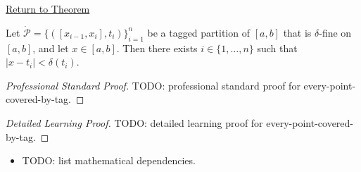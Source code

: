 \newpage
{}
\label{prf:every-point-covered-by-tag}

\begin{remark*}[Return]
\hyperref[lem:every-point-covered-by-tag]{Return to Theorem}
\end{remark*}

\begin{lemma*}
Let $\dot{\mathcal{P}}=\{([x_{i-1},x_i],t_i)\}_{i=1}^n$ be a tagged partition of $[a,b]$ that is $\delta$-fine on $[a,b]$, and let $x\in[a,b]$. Then there exists $i\in\{1,\ldots,n\}$ such that $|x-t_i|<\delta(t_i)$.
\end{lemma*}

\begin{proof}[Professional Standard Proof]
\LRAProofBodyStart
TODO: professional standard proof for every-point-covered-by-tag.
\end{proof}

\begin{proof}[Detailed Learning Proof]
\LRAProofBodyStart
TODO: detailed learning proof for every-point-covered-by-tag.
\end{proof}

\begin{remark*}
\end{remark*}

\begin{dependencies}
\begin{itemize}
  \item TODO: list mathematical dependencies.
\end{itemize}
\end{dependencies}

\clearpage
